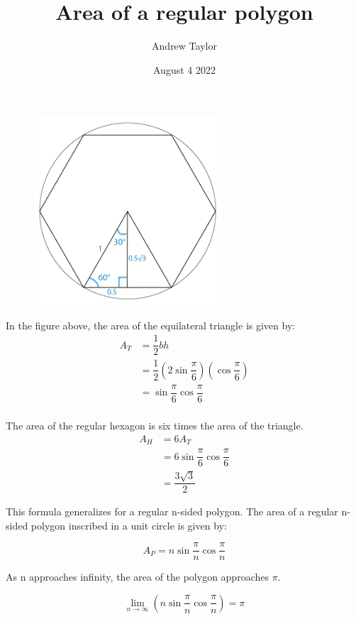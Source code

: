 \documentclass{article}
\title{Area of a regular polygon}
\author{Andrew Taylor}
\date{August 4 2022}
\begin{document}
\maketitle

\begin{figure}[h]
\centering
\includegraphics[width=7cm]{regularhexagoninscribed}
\end{figure}

In the figure above, the area of the equilateral triangle is given by:
\begin{align*}
A_{T} &= \dfrac{1}{2}bh \\
&= \dfrac{1}{2}\left(2\sin\dfrac{\pi}{6}\right)\left(\cos\dfrac{\pi}{6}\right) \\
&= \sin\dfrac{\pi}{6}\cos\dfrac{\pi}{6} \\
\end{align*}

The area of the regular hexagon is six times the area of the triangle.
\begin{align*}
A_{H} &= 6A_{T} \\
&= 6\sin\dfrac{\pi}{6}\cos\dfrac{\pi}{6} \\
&=\dfrac{3\sqrt{3}}{2}
\end{align*}

This formula generalizes for a regular n-sided polygon. The area of a regular n-sided polygon inscribed in a unit circle is given by:

\begin{equation}
A_{P} = n \sin \dfrac{\pi}{n} \cos \dfrac{\pi}{n}
\end{equation}

As n approaches infinity, the area of the polygon approaches $\pi$.

\begin{equation}
\lim_{n \to \infty} \left( n \sin \dfrac{\pi}{n} \cos \dfrac{\pi}{n} \right) = \pi
\end{equation}
\end{document}
